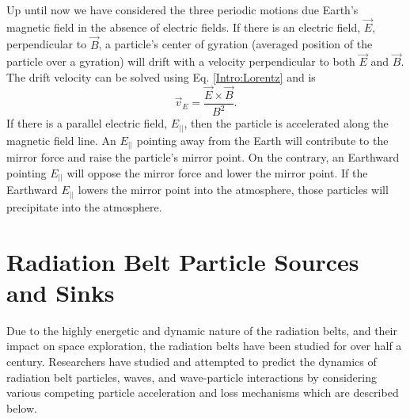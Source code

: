 Up until now we have considered the three periodic motions due Earth's magnetic field in the absence of electric fields. If there is an electric field, $\vec{E}$, perpendicular to $\vec{B}$, a particle's center of gyration (averaged position of the particle over a gyration) will drift with a velocity perpendicular to both $\vec{E}$ and $\vec{B}$. The drift velocity can be solved using Eq. \ref{Intro:Lorentz} and is
\begin{equation}
\vec{v}_E = \frac{\vec{E} \times \vec{B}}{B^2}.
\end{equation} If there is a parallel electric field, $E_{||}$, then the particle is accelerated along the magnetic field line. An $E_{||}$  pointing away from the Earth will contribute to the mirror force and raise the particle's mirror point. On the contrary, an Earthward pointing $E_{||}$ will oppose the mirror force and lower the mirror point. If the Earthward $E_{||}$ lowers the mirror point into the atmosphere, those particles will precipitate into the atmosphere.

\section{Radiation Belt Particle Sources and Sinks}\label{Intro:sources_sinks}
Due to the highly energetic and dynamic nature of the radiation belts, and their impact on space exploration, the radiation belts have been studied for over half a century. Researchers have studied and attempted to predict the dynamics of radiation belt particles, waves, and wave-particle interactions by considering various competing particle acceleration and loss mechanisms which are described below.


